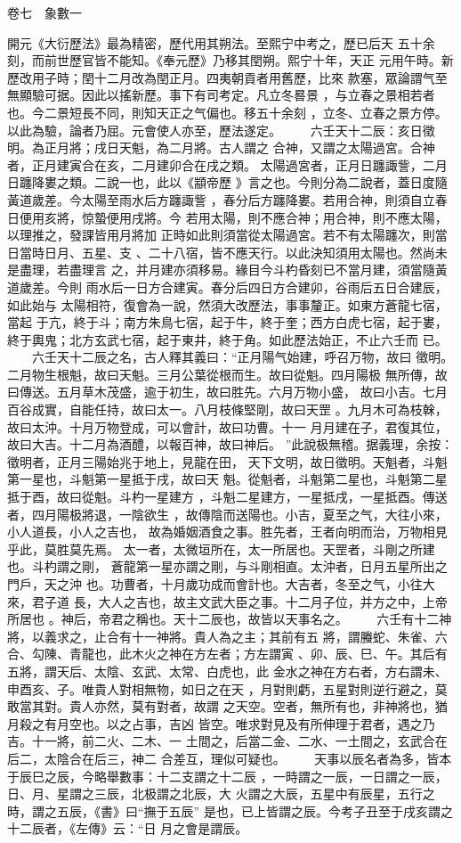 \documentclass{ctexart}
\begin{document}
卷七　象數一

開元《大衍歷法》最為精密，歷代用其朔法。至熙宁中考之，歷已后天 五十余刻，而前世歷官皆不能知。《奉元歷》乃移其閏朔。熙宁十年，天正 元用午時。新歷改用子時；閏十二月改為閏正月。四夷朝貢者用舊歷，比來 款塞，眾論謂气至無顯驗可据。因此以搖新歷。事下有司考定。凡立冬晷景 ，与立春之景相若者也。今二景短長不同，則知天正之气偏也。移五十余刻 ，立冬、立春之景方停。以此為驗，論者乃屈。元會使人亦至，歷法遂定。 　　六壬天十二辰：亥日徵明。為正月將；戌日天魁，為二月將。古人謂之 合神，又謂之太陽過宮。合神者，正月建寅合在亥，二月建卯合在戌之類。 太陽過宮者，正月日躔諏訾，二月日躔降婁之類。二說一也，此以《顓帝歷 》言之也。今則分為二說者，蓋日度隨黃道歲差。今太陽至雨水后方躔諏訾 ，春分后方躔降婁。若用合神，則須自立春日便用亥將，惊蟄便用戌將。今 若用太陽，則不應合神；用合神，則不應太陽，以理推之，發課皆用月將加 正時如此則須當從太陽過宮。若不有太陽躔次，則當日當時日月、五星、支 、二十八宿，皆不應天行。以此決知須用太陽也。然尚未是盡理，若盡理言 之，并月建亦須移易。緣目今斗杓昏刻已不當月建，須當隨黃道歲差。今則 雨水后一日方合建寅。春分后四日方合建卯，谷雨后五日合建辰，如此始与 太陽相符，復會為一說，然須大改歷法，事事釐正。如東方蒼龍七宿，當起 于亢，終于斗；南方朱鳥七宿，起于牛，終于奎；西方白虎七宿，起于婁， 終于輿鬼；北方玄武七宿，起于東井，終于角。如此歷法始正，不止六壬而 已。 　　六壬天十二辰之名，古人釋其義曰：``正月陽气始建，呼召万物，故曰 徵明。二月物生根魁，故曰天魁。三月公葉從根而生。故曰從魁。四月陽极 無所傳，故曰傳送。五月草木茂盛，逾于初生，故曰胜先。六月万物小盛， 故曰小吉。七月百谷成實，自能任持，故曰太一。八月枝條堅剛，故曰天罡 。九月木可為枝榦，故曰太沖。十月万物登成，可以會計，故曰功曹。十一 月月建在子，君復其位，故曰大吉。十二月為酒醴，以報百神，故曰神后。 ''此說极無稽。据義理，余按：徵明者，正月三陽始兆于地上，見龍在田， 天下文明，故日徵明。天魁者，斗魁第一星也，斗魁第一星抵于戌，故曰天 魁。從魁者，斗魁第二星也，斗魁第二星抵于酉，故曰從魁。斗杓一星建方 ，斗魁二星建方，一星抵戌，一星抵酉。傳送者，四月陽极將退，一陰欲生 ，故傳陰而送陽也。小吉，夏至之气，大往小來，小人道長，小人之吉也， 故為婚姻酒食之事。胜先者，王者向明而治，万物相見乎此，莫胜莫先焉。 太一者，太微垣所在，太一所居也。天罡者，斗剛之所建也。斗杓謂之剛， 蒼龍第一星亦謂之剛，与斗剛相直。太沖者，日月五星所出之門戶，天之沖 也。功曹者，十月歲功成而會計也。大吉者，冬至之气，小往大來，君子道 長，大人之吉也，故主文武大臣之事。十二月子位，并方之中，上帝所居也 。神后，帝君之稱也。天十二辰也，故皆以天事名之。 　　六壬有十二神將，以義求之，止合有十一神將。貴人為之主；其前有五 將，謂螣蛇、朱雀、六合、勾陳、青龍也，此木火之神在方左者；方左謂寅 、卯、辰、巳、午。其后有五將，謂天后、太陰、玄武、太常、白虎也，此 金水之神在方右者，方右謂未、申酉亥、子。唯貴人對相無物，如日之在天 ，月對則虧，五星對則逆行避之，莫敢當其對。貴人亦然，莫有對者，故謂 之天空。空者，無所有也，非神將也，猶月殺之有月空也。以之占事，吉凶 皆空。唯求對見及有所伸理于君者，遇之乃吉。十一將，前二火、二木、一 土間之，后當二金、二水、一土間之，玄武合在后二，太陰合在后三，神二 合差互，理似可疑也。 　　天事以辰名者為多，皆本于辰巳之辰，今略舉數事：十二支謂之十二辰 ，一時謂之一辰，一日謂之一辰，日、月、星謂之三辰，北极謂之北辰，大 火謂之大辰，五星中有辰星，五行之時，謂之五辰，《書》曰``撫于五辰'' 是也，已上皆謂之辰。今考子丑至于戌亥謂之十二辰者，《左傳》云：``日 月之會是謂辰。 
\end{document}
